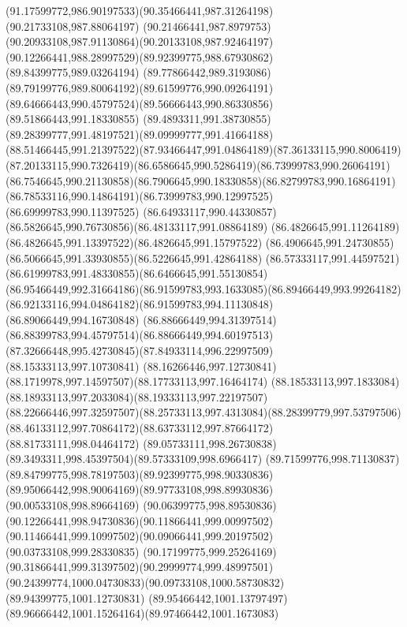 {{	\curveto(91.17599772,986.90197533)(90.35466441,987.31264198)(90.21733108,987.88064197)
	\curveto(90.21466441,987.8979753)(90.20933108,987.91130864)(90.20133108,987.92464197)
	\curveto(90.12266441,988.28997529)(89.92399775,988.67930862)(89.84399775,989.03264194)
	\curveto(89.77866442,989.3193086)(89.79199776,989.80064192)(89.61599776,990.09264191)
	\curveto(89.64666443,990.45797524)(89.56666443,990.86330856)(89.51866443,991.18330855)
	\curveto(89.4893311,991.38730855)(89.28399777,991.48197521)(89.09999777,991.41664188)
	\curveto(88.51466445,991.21397522)(87.93466447,991.04864189)(87.36133115,990.8006419)
	\curveto(87.20133115,990.7326419)(86.6586645,990.5286419)(86.73999783,990.26064191)
	\curveto(86.7546645,990.21130858)(86.7906645,990.18330858)(86.82799783,990.16864191)
	\curveto(86.78533116,990.14864191)(86.73999783,990.12997525)(86.69999783,990.11397525)
	\curveto(86.64933117,990.44330857)(86.5826645,990.76730856)(86.48133117,991.08864189)
	\curveto(86.4826645,991.11264189)(86.4826645,991.13397522)(86.4826645,991.15797522)
	\curveto(86.4906645,991.24730855)(86.5066645,991.33930855)(86.5226645,991.42864188)
	\curveto(86.57333117,991.44597521)(86.61999783,991.48330855)(86.6466645,991.55130854)
	\curveto(86.95466449,992.31664186)(86.91599783,993.1633085)(86.89466449,993.99264182)
	\curveto(86.92133116,994.04864182)(86.91599783,994.11130848)(86.89066449,994.16730848)
	\curveto(86.88666449,994.31397514)(86.88399783,994.45797514)(86.88666449,994.60197513)
	\curveto(87.32666448,995.42730845)(87.84933114,996.22997509)(88.15333113,997.10730841)
	\curveto(88.16266446,997.12730841)(88.1719978,997.14597507)(88.17733113,997.16464174)
	\curveto(88.18533113,997.1833084)(88.18933113,997.2033084)(88.19333113,997.22197507)
	\curveto(88.22666446,997.32597507)(88.25733113,997.4313084)(88.28399779,997.53797506)
	\curveto(88.46133112,997.70864172)(88.63733112,997.87664172)(88.81733111,998.04464172)
	\curveto(89.05733111,998.26730838)(89.3493311,998.45397504)(89.57333109,998.6966417)
	\curveto(89.71599776,998.71130837)(89.84799775,998.78197503)(89.92399775,998.90330836)
	\curveto(89.95066442,998.90064169)(89.97733108,998.89930836)(90.00533108,998.89664169)
	\curveto(90.06399775,998.89530836)(90.12266441,998.94730836)(90.11866441,999.00997502)
	\curveto(90.11466441,999.10997502)(90.09066441,999.20197502)(90.03733108,999.28330835)
	\curveto(90.17199775,999.25264169)(90.31866441,999.31397502)(90.29999774,999.48997501)
	\curveto(90.24399774,1000.04730833)(90.09733108,1000.58730832)(89.94399775,1001.12730831)
	\curveto(89.95466442,1001.13797497)(89.96666442,1001.15264164)(89.97466442,1001.1673083)
}}
